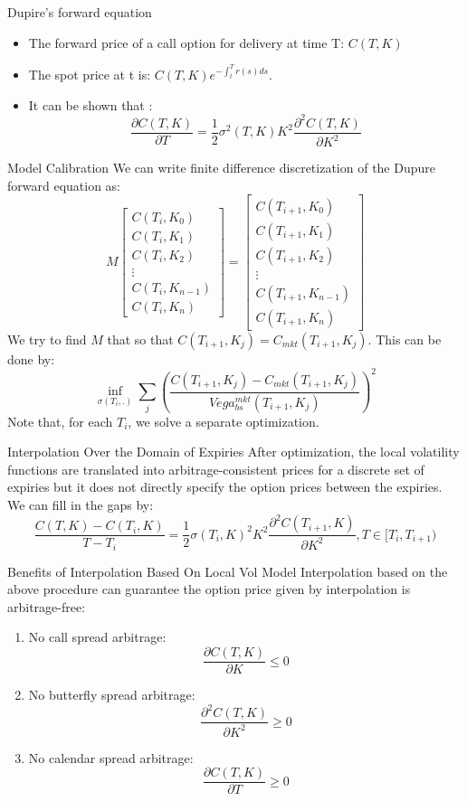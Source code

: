 \documentclass[10pt,table,mathserif]{beamer}
\begin{document}
\begin{frame}{Dupire’s forward equation}
\begin{itemize}
\item The forward price of a call option for delivery at time T:	$C(T,K)$
\item The spot price at t is: $C(T,K) e^{-\int^T_t r(s)ds}$.
\item It can be shown that :
\[
\frac{\partial C(T,K)}{\partial T}=\frac{1}{2} {\sigma}^2(T,K)K^2  \frac{\partial^2 C(T,K)}{ \partial K^2}
\]
\end{itemize}
\end{frame}




\begin{frame}{Model Calibration}
We can write finite difference  discretization of the Dupure forward equation as:
\[M\begin{bmatrix}
C(T_{i},K_0)\\
C(T_{i},K_1)\\
C(T_{i},K_2)\\
\vdots\\
C(T_{i},K_{n-1}) \\
C(T_{i},K_{n})
\end{bmatrix}=
\begin{bmatrix}
C(T_{i+1},K_0)\\
C(T_{i+1},K_1)\\
C(T_{i+1},K_2)\\
\vdots\\
C(T_{i+1},K_{n-1}) \\
C(T_{i+1},K_{n})
\end{bmatrix}
\]
We try to find $M$ that so that $C(T_{i+1},K_j)=C_{mkt}(T_{i+1},K_j)$. This can be done by:
\[
\inf_{\sigma(T_i,.)} \sum_{j}(\frac{C(T_{i+1},K_j)-C_{mkt}(T_{i+1},K_j)}{Vega_{bs}^{mkt}(T_{i+1},K_j)})^2
\]
Note that, for each $T_i$, we solve a separate optimization.  
\end{frame}


\begin{frame}{Interpolation Over  the Domain of Expiries}
After optimization,  the local volatility functions are translated into arbitrage-consistent prices for a discrete set of expiries but it does not
directly specify the option prices between the expiries. We can fill in the gaps by:
\[
\frac{C(T,K) -C(T_{i},K)}{T-T_{i}}=\frac{1}{2}\sigma(T_i,K)^2 K^2 \frac{\partial^2 C(T_{i+1},K) }  {\partial K^2} , T \in [T_i,T_{i+1})
\]
\end{frame}
\begin{frame}{Benefits of Interpolation Based On Local Vol Model}
Interpolation based on the above procedure can guarantee the option price given by interpolation is arbitrage-free:
\begin{enumerate}
\item No call spread arbitrage:
\[
\frac{\partial C(T,K)}{ \partial K} \leq 0
\]
\item  No butterfly spread arbitrage:
\[
\frac{\partial^2 C(T,K)}{ \partial K^2} \geq 0
\]
\item  No calendar spread arbitrage:
\[
\frac{\partial C(T,K)}{ \partial T} \geq 0
\]
\end{enumerate}
\end{frame}
\end{document}
